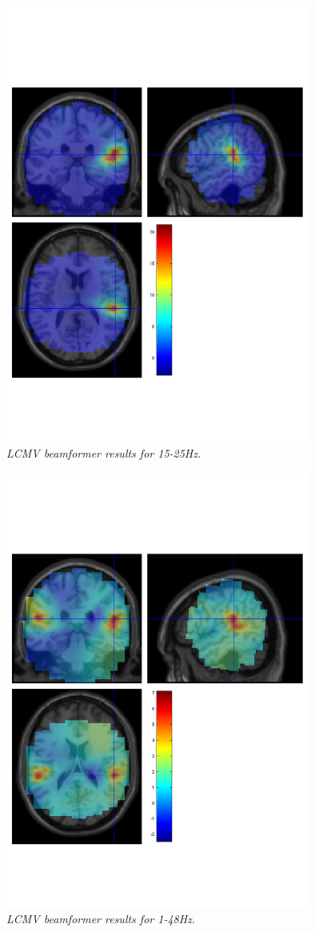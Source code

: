 \begin{figure}
\begin{center}
\includegraphics[width=100mm]{meg_sloc/slide10}
\caption{\em LCMV beamformer results for 15-25Hz.\label{meg_sloc:fig:10}}
\end{center}
\end{figure}

\begin{figure}
\begin{center}
\includegraphics[width=100mm]{meg_sloc/slide11}
\caption{\em LCMV beamformer results for 1-48Hz.\label{meg_sloc:fig:11}}
\end{center}
\end{figure}

